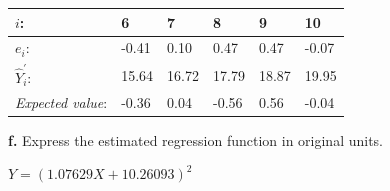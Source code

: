 \documentclass[
  letterpaper,
  DIV=11,
  numbers=noendperiod]{scrartcl}
\begin{document}
\begin{longtable}[]{@{}llllll@{}}
\toprule()
\(i\): & 6 & 7 & 8 & 9 & 10 \\
\midrule()
\endhead
\(e_{i}\): & -0.41 & 0.10 & 0.47 & 0.47 & -0.07 \\
\(\hat Y_{i}^{'}\): & 15.64 & 16.72 & 17.79 & 18.87 & 19.95 \\
\emph{Expected value}: & -0.36 & 0.04 & -0.56 & 0.56 & -0.04 \\
\bottomrule()
\end{longtable}

\textbf{f.} Express the estimated regression function in original units.

\(Y = (1.07629X + 10.26093)^{2}\)
\end{document}
